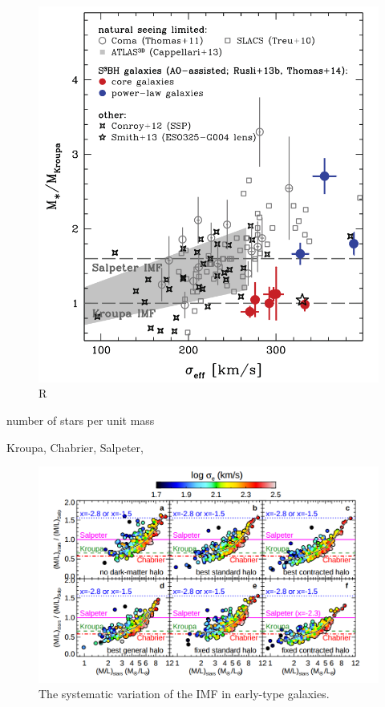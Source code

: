 \begin{figure}[H]
\centering
\includegraphics[width=12cm]{images/IMFs.png}
\caption[R]{R}
\end{figure}

number of stars per unit mass

Kroupa, Chabrier, Salpeter, 

\begin{figure}[H]
\centering
\includegraphics[width=12cm]{images/IMFs_paper.png}
\caption[The systematic variation of the IMF in early-type galaxies.]{The systematic variation of the IMF in early-type galaxies.}
\end{figure}

